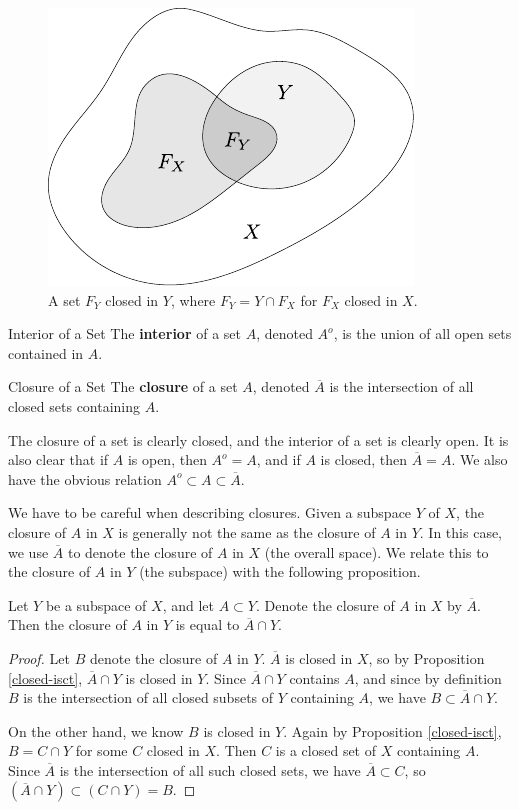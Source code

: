 \documentclass[10pt]{report}
\begin{document}
\begin{figure}[H]
	\centering
	\includegraphics[scale=1]{fig/closed-isct.pdf}
	\caption{A set $F_Y$ closed in $Y$, where $F_Y = Y \cap F_X$ for $F_X$ closed in $X$.}
\end{figure}

\begin{defn}{Interior of a Set}{}
	The \textbf{interior} of a set $A$, denoted $A^o$, is the union of all open sets contained in $A$.
\end{defn}

\begin{defn}{Closure of a Set}{}
	The \textbf{closure} of a set $A$, denoted $\overline{A}$ is the intersection of all closed sets containing $A$.
\end{defn}

The closure of a set is clearly closed, and the interior of a set is clearly open. It is also clear that if $A$ is open, then $A^o = A$, and if $A$ is closed, then $\overline{A}=A$. We also have the obvious relation $A^o \subset A \subset \overline{A}$.

We have to be careful when describing closures. Given a subspace $Y$ of $X$, the closure of $A$ in $X$ is generally not the same as the closure of $A$ in $Y$. In this case, we use $\overline{A}$ to denote the closure of $A$ in $X$ (the overall space). We relate this to the closure of $A$ in $Y$ (the subspace) with the following proposition.

\begin{prop}
	Let $Y$ be a subspace of $X$, and let $A \subset Y$. Denote the closure of $A$ in $X$ by $\overline{A}$. Then the closure of $A$ in $Y$ is equal to $\overline{A} \cap Y$.
\end{prop}
\begin{proof}
	Let $B$ denote the closure of $A$ in $Y$. $\overline{A}$ is closed in $X$, so by Proposition \ref{closed-isct}, $\overline{A} \cap Y$ is closed in $Y$. Since $\overline{A} \cap Y$ contains $A$, and since by definition $B$ is the intersection of all closed subsets of $Y$ containing $A$, we have $B \subset \overline{A}\cap Y$.

	On the other hand, we know $B$ is closed in $Y$. Again by Proposition \ref{closed-isct}, $B = C \cap Y$ for some $C$ closed in $X$. Then $C$ is a closed set of $X$ containing $A$. Since $\overline{A}$ is the intersection of all such closed sets, we have $\overline{A} \subset C$, so $(\overline{A} \cap Y) \subset (C \cap Y) = B$.
\end{proof}
\end{document}
